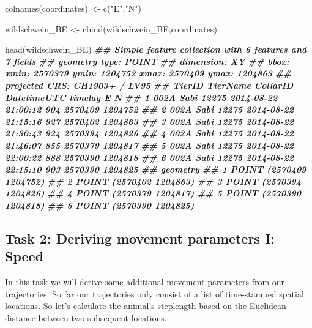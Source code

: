\documentclass[
]{book}
\newenvironment{Shaded}{\begin{snugshade}}{\end{snugshade}}
\newcommand{\DocumentationTok}[1]{\textcolor[rgb]{0.56,0.35,0.01}{\textbf{\textit{#1}}}}
\newcommand{\FunctionTok}[1]{\textcolor[rgb]{0.00,0.00,0.00}{#1}}
\newcommand{\NormalTok}[1]{#1}
\newcommand{\OtherTok}[1]{\textcolor[rgb]{0.56,0.35,0.01}{#1}}
\newcommand{\StringTok}[1]{\textcolor[rgb]{0.31,0.60,0.02}{#1}}
\begin{document}
\begin{Shaded}
\begin{Highlighting}[]
\FunctionTok{colnames}\NormalTok{(coordinates) }\OtherTok{\textless{}{-}} \FunctionTok{c}\NormalTok{(}\StringTok{"E"}\NormalTok{,}\StringTok{"N"}\NormalTok{)}

\NormalTok{wildschwein\_BE }\OtherTok{\textless{}{-}} \FunctionTok{cbind}\NormalTok{(wildschwein\_BE,coordinates)}

\FunctionTok{head}\NormalTok{(wildschwein\_BE)}
\DocumentationTok{\#\# Simple feature collection with 6 features and 7 fields}
\DocumentationTok{\#\# geometry type:  POINT}
\DocumentationTok{\#\# dimension:      XY}
\DocumentationTok{\#\# bbox:           xmin: 2570379 ymin: 1204752 xmax: 2570409 ymax: 1204863}
\DocumentationTok{\#\# projected CRS:  CH1903+ / LV95}
\DocumentationTok{\#\#   TierID TierName CollarID         DatetimeUTC timelag       E       N}
\DocumentationTok{\#\# 1   002A     Sabi    12275 2014{-}08{-}22 21:00:12     904 2570409 1204752}
\DocumentationTok{\#\# 2   002A     Sabi    12275 2014{-}08{-}22 21:15:16     927 2570402 1204863}
\DocumentationTok{\#\# 3   002A     Sabi    12275 2014{-}08{-}22 21:30:43     924 2570394 1204826}
\DocumentationTok{\#\# 4   002A     Sabi    12275 2014{-}08{-}22 21:46:07     855 2570379 1204817}
\DocumentationTok{\#\# 5   002A     Sabi    12275 2014{-}08{-}22 22:00:22     888 2570390 1204818}
\DocumentationTok{\#\# 6   002A     Sabi    12275 2014{-}08{-}22 22:15:10     903 2570390 1204825}
\DocumentationTok{\#\#                  geometry}
\DocumentationTok{\#\# 1 POINT (2570409 1204752)}
\DocumentationTok{\#\# 2 POINT (2570402 1204863)}
\DocumentationTok{\#\# 3 POINT (2570394 1204826)}
\DocumentationTok{\#\# 4 POINT (2570379 1204817)}
\DocumentationTok{\#\# 5 POINT (2570390 1204818)}
\DocumentationTok{\#\# 6 POINT (2570390 1204825)}
\end{Highlighting}
\end{Shaded}

\hypertarget{task-2-deriving-movement-parameters-i-speed}{%
\subsection{Task 2: Deriving movement parameters I: Speed}\label{task-2-deriving-movement-parameters-i-speed}}

In this task we will derive some additional movement parameters from our trajectories. So far our trajectories only consist of a list of time-stamped spatial locations. So let's calculate the animal's steplength based on the Euclidean distance between two subsequent locations.
\end{document}
